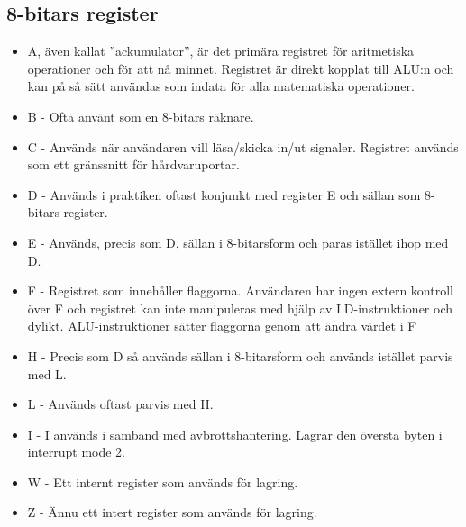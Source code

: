 \documentclass{article}
\begin{document}
\subsection{8-bitars register}
\begin{itemize}
    \item A, även kallat ''ackumulator'', är det primära registret för
    aritmetiska operationer och för att nå minnet. Registret är direkt kopplat
    till ALU:n och kan på så sätt användas som indata för alla matematiska
    operationer.
    \item B - Ofta använt som en 8-bitars räknare.
    \item C - Används när användaren vill läsa/skicka in/ut signaler. Registret
    används som ett gränssnitt för hårdvaruportar.
    \item D - Används i praktiken oftast konjunkt med register E och sällan som
    8-bitars register.
    \item E - Används, precis som D, sällan i 8-bitarsform och paras istället
    ihop med D.
    \item F - Registret som innehåller flaggorna. Användaren har ingen extern
    kontroll över F och registret kan inte manipuleras med hjälp av
    LD-instruktioner och dylikt. ALU-instruktioner sätter flaggorna genom att
    ändra värdet i F
    \item H - Precis som D så används sällan i 8-bitarsform och används
    istället parvis med L.
    \item L - Används oftast parvis med H.
    \item I - I används i samband med avbrottshantering. Lagrar den översta
    byten i interrupt mode 2.
    \item W - Ett internt register som används för lagring.
    \item Z - Ännu ett intert register som används för lagring.
\end{itemize}
\end{document}
